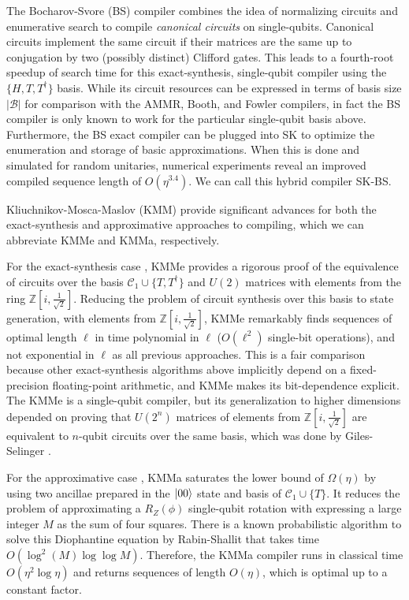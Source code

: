 The Bocharov-Svore (BS) compiler combines the idea of normalizing circuits
and enumerative search to compile \emph{canonical circuits} on single-qubits.
Canonical circuits
implement the same circuit if their matrices are the same up to
conjugation by two (possibly distinct) Clifford gates. This leads to
a fourth-root speedup of search time for this exact-synthesis, single-qubit
compiler using the $\{H, T, T^{\dagger} \}$ basis. While its circuit resources
can be expressed in terms of basis size $|\mathcal{B}|$ for comparison with
the AMMR, Booth, and Fowler compilers, in fact the BS compiler is only known
to work for the particular single-qubit basis above. Furthermore, the BS exact
compiler can be plugged into SK to optimize the enumeration and storage of
basic approximations. When this is done and simulated for
random unitaries, numerical experiments reveal an improved compiled
sequence length of $O(\eta^{3.4})$. We can call this hybrid
compiler SK-BS.

Kliuchnikov-Mosca-Maslov (KMM) provide significant advances for both the
exact-synthesis and approximative approaches to compiling, which we can
abbreviate KMMe and KMMa, respectively.

For the
exact-synthesis case \cite{Kliuchnikov2012e},
KMMe provides a rigorous proof of the equivalence
of circuits over the basis $\mathcal{C}_1 \cup \{T, T^{\dagger} \}$ and $U(2)$ matrices
with elements from the ring $\mathbb{Z}\left[i,\frac{1}{\sqrt{2}}\right]$.
Reducing the problem of circuit synthesis over this basis to state
generation, with elements from $\mathbb{Z}\left[i,\frac{1}{\sqrt{2}}\right]$,
KMMe remarkably finds sequences of optimal length $\ell$ in time
polynomial in $\ell$
($O(\ell ^2)$ single-bit operations), and not exponential in $\ell$ as
all previous approaches. This is a fair comparison because other 
exact-synthesis algorithms above implicitly
depend on a fixed-precision floating-point
arithmetic, and KMMe makes its bit-dependence explicit. The KMMe is
a single-qubit compiler, but its generalization to higher dimensions
depended on proving that
$U(2^n)$ matrices of elements from $\mathbb{Z}\left[i,\frac{1}{\sqrt{2}}\right]$
are equivalent to $n$-qubit circuits over the same basis, which was done by
Giles-Selinger \cite{Giles2013}.

For the approximative case \cite{Kliuchnikov2012a}, KMMa saturates the lower
bound of $\Omega(\eta)$ by using two ancillae prepared in the
$\left\vert{00}\right\rangle$ state and basis of $\mathcal{C}_1 \cup \{ T \}$.
It reduces the problem of approximating a
$R_Z(\phi)$ single-qubit rotation with expressing a large integer $M$ as the
sum of four squares. There is a known probabilistic algorithm to
solve this Diophantine equation
by Rabin-Shallit \cite{Rabin1985} that takes time $O(\log^2(M)\log\log M)$. Therefore,
the KMMa compiler runs in classical time $O(\eta^2\log\eta)$
and returns sequences of length $O(\eta)$, which is optimal up to
a constant factor.

